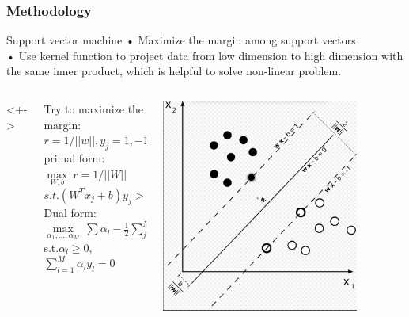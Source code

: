 \documentclass[xcolor={x11names,svgnames,dvipsnames}]{beamer}
\begin{document}
\begin{frame}
\frametitle{Methodology}
\begin{block}{Support vector machine}
{\small
• Maximize the margin among support vectors\\
• Use kernel function to project data from low dimension to high dimension with the same inner product, which is helpful to solve non-linear problem. \\
}
\end{block}

\begin{columns}<+->
\begin{column}{0.6\textwidth}
\small {
Try to maximize the margin:\\ 
$r=1/||w||,y_j=1,-1$\\
\alert{primal form}:\\
$\max\limits_{W,b}\ r= 1/||W||$\\
$s.t.(W^Tx_j+b)y_j>=1$\\
\alert{Dual form}:\\
$\max\limits_{\alpha_1,...,\alpha_M}\ \sum\alpha_l-\frac{1}{2}\sum_{j=1}^{M}\sum_{k=1}^{M}\alpha_j\alpha_k y_j y_k<X_j,X_k>$\\
s.t.$\alpha_l\geq 0$, $\sum_{l=1}^{M}\alpha_ly_l=0$
}
\end{column}
\begin{column}{.4\textwidth}
     \includegraphics[width=0.8\textwidth, height=0.4\textheight]{svm.png}
\end{column}
\end{columns}
\end{frame}
\end{document}
